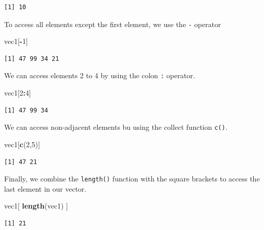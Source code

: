 \documentclass[]{article}
\newenvironment{Shaded}{\begin{snugshade}}{\end{snugshade}}
\newcommand{\DecValTok}[1]{\textcolor[rgb]{0.00,0.00,0.81}{#1}}
\newcommand{\KeywordTok}[1]{\textcolor[rgb]{0.13,0.29,0.53}{\textbf{#1}}}
\newcommand{\NormalTok}[1]{#1}
\newcommand{\OperatorTok}[1]{\textcolor[rgb]{0.81,0.36,0.00}{\textbf{#1}}}
\begin{document}
\begin{verbatim}
[1] 10
\end{verbatim}

To access all elements except the first element, we use the \texttt{-} operator

\begin{Shaded}
\begin{Highlighting}[]
\NormalTok{vec1[}\OperatorTok{-}\DecValTok{1}\NormalTok{]}
\end{Highlighting}
\end{Shaded}

\begin{verbatim}
[1] 47 99 34 21
\end{verbatim}

We can access elements 2 to 4 by using the colon \texttt{:} operator.

\begin{Shaded}
\begin{Highlighting}[]
\NormalTok{vec1[}\DecValTok{2}\OperatorTok{:}\DecValTok{4}\NormalTok{]}
\end{Highlighting}
\end{Shaded}

\begin{verbatim}
[1] 47 99 34
\end{verbatim}

We can access non-adjacent elements bu using the collect function \texttt{c()}.

\begin{Shaded}
\begin{Highlighting}[]
\NormalTok{vec1[}\KeywordTok{c}\NormalTok{(}\DecValTok{2}\NormalTok{,}\DecValTok{5}\NormalTok{)]}
\end{Highlighting}
\end{Shaded}

\begin{verbatim}
[1] 47 21
\end{verbatim}

Finally, we combine the \texttt{length()} function with the square brackets to access the last element in our vector.

\begin{Shaded}
\begin{Highlighting}[]
\NormalTok{vec1[ }\KeywordTok{length}\NormalTok{(vec1) ]}
\end{Highlighting}
\end{Shaded}

\begin{verbatim}
[1] 21
\end{verbatim}
\end{document}
